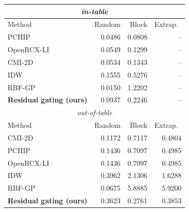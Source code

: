 \small
\begin{tabular}{lrrr}\toprule
\multicolumn{4}{c}{\emph{in-table}} \\\midrule
Method & Random & Block & Extrap.\ \\\midrule
PCHIP & 0.0486 & 0.0808 & -- \\
OpenRCX-LI & 0.0549 & 0.1299 & -- \\
CMI-2D & 0.0534 & 0.1343 & -- \\
IDW & 0.1555 & 0.5276 & -- \\
RBF-GP & 0.0150 & 1.2202 & -- \\
\textbf{Residual gating (ours)} & 0.0937 & 0.2246 & -- \\
\midrule\multicolumn{4}{c}{\emph{out-of-table}} \\\midrule
Method & Random & Block & Extrap.\ \\\midrule
CMI-2D & 0.1172 & 0.7117 & 0.4804 \\
PCHIP & 0.1436 & 0.7097 & 0.4985 \\
OpenRCX-LI & 0.1436 & 0.7097 & 0.4985 \\
IDW & 0.3962 & 2.1306 & 1.6288 \\
RBF-GP & 0.0675 & 5.8885 & 5.9200 \\
\textbf{Residual gating (ours)} & 0.3623 & 0.2761 & 0.3853 \\
\bottomrule\end{tabular}
